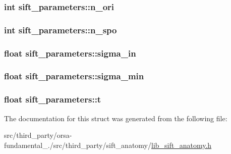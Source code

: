 \subsubsection[{n\+\_\+ori}]{\setlength{\rightskip}{0pt plus 5cm}int sift\+\_\+parameters\+::n\+\_\+ori}\label{structsift__parameters_afdeeea3884a93c53734b656fcca9d55d}
\hypertarget{structsift__parameters_acdf15d1e0ac14b02537e80ab7d045d7b}{}
\subsubsection[{n\+\_\+spo}]{\setlength{\rightskip}{0pt plus 5cm}int sift\+\_\+parameters\+::n\+\_\+spo}\label{structsift__parameters_acdf15d1e0ac14b02537e80ab7d045d7b}
\hypertarget{structsift__parameters_ac9e701f1bd3fa03ef219da6eb794646e}{}
\subsubsection[{sigma\+\_\+in}]{\setlength{\rightskip}{0pt plus 5cm}float sift\+\_\+parameters\+::sigma\+\_\+in}\label{structsift__parameters_ac9e701f1bd3fa03ef219da6eb794646e}
\hypertarget{structsift__parameters_a3ae4e767d5e8956fe4c9ddd2a01bcc19}{}
\subsubsection[{sigma\+\_\+min}]{\setlength{\rightskip}{0pt plus 5cm}float sift\+\_\+parameters\+::sigma\+\_\+min}\label{structsift__parameters_a3ae4e767d5e8956fe4c9ddd2a01bcc19}
\hypertarget{structsift__parameters_ac3e56b708dcd6829cb3448491e44c7e5}{}
\subsubsection[{t}]{\setlength{\rightskip}{0pt plus 5cm}float sift\+\_\+parameters\+::t}\label{structsift__parameters_ac3e56b708dcd6829cb3448491e44c7e5}


The documentation for this struct was generated from the following file\+:\begin{DoxyCompactItemize}
\item 
src/third\+\_\+party/orsa-\/fundamental\+\_./src/third\+\_\+party/sift\+\_\+anatomy/\hyperlink{lib__sift__anatomy_8h}{lib\+\_\+sift\+\_\+anatomy.\+h}\end{DoxyCompactItemize}
